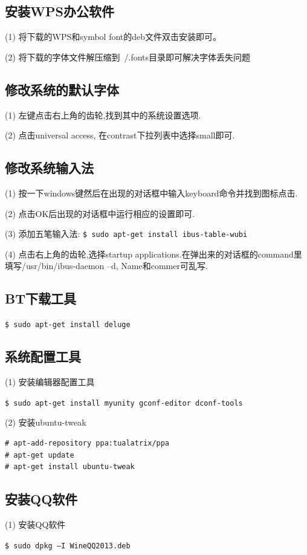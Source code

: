 \subsection{安装WPS办公软件}
(1) 将下载的WPS和symbol font的deb文件双击安装即可。

(2) 将下载的字体文件解压缩到~/.fonts目录即可解决字体丢失问题

\subsection{修改系统的默认字体}
(1) 左键点击右上角的齿轮,找到其中的系统设置选项.

(2) 点击universal access, 在contrast下拉列表中选择small即可.

\subsection{修改系统输入法}
(1) 按一下windows键然后在出现的对话框中输入keyboard命令并找到图标点击.

(2) 点击OK后出现的对话框中运行相应的设置即可.

(3) 添加五笔输入法:
\verb"$ sudo apt-get install ibus-table-wubi"

(4) 点击右上角的齿轮,选择startup applications.在弹出来的对话框的command里填写/usr/bin/ibus-daemon –d, Name和commer可乱写.

\subsection{BT下载工具}
\verb"$ sudo apt-get install deluge"

\subsection{系统配置工具}
(1) 安装编辑器配置工具

\verb"$ sudo apt-get install myunity gconf-editor dconf-tools"

(2) 安装ubuntu-tweak
\begin{verbatim}
# apt-add-repository ppa:tualatrix/ppa
# apt-get update
# apt-get install ubuntu-tweak
\end{verbatim}

\subsection{安装QQ软件}
(1) 安装QQ软件

\verb"$ sudo dpkg –I WineQQ2013.deb"

